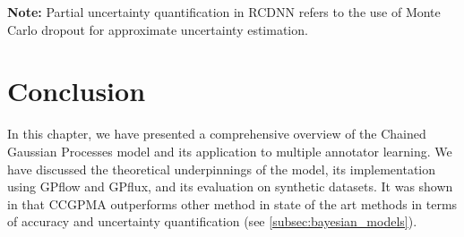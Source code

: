 \begin{table}[!htb]
\caption{Comparison of Multiple Annotator Learning Methods}
\label{tab:methods_comparison}
\centering
{}
\vspace{0.1cm}
{\small{\textbf{Note:} Partial uncertainty quantification in RCDNN
  refers to the use of Monte Carlo dropout for approximate
uncertainty estimation.}}
\end{table}

\section{Conclusion}\label{sec:cgp_conclusion}

In this chapter, we have presented a comprehensive overview of the
Chained Gaussian Processes model and its application to multiple
annotator learning. We have discussed the theoretical underpinnings of
the model, its implementation using GPflow and GPflux, and its
evaluation on synthetic datasets. It was shown in
\cite{GilGonzalezEtAl2023} that \gls{CCGPMA} outperforms other method
in state of the art methods in terms of accuracy and uncertainty
quantification (see \ref{subsec:bayesian_models}).
